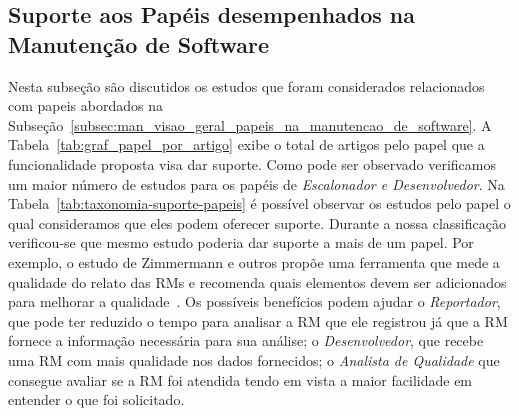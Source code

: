 \subsection{Suporte aos Papéis desempenhados na Manutenção de Software}\label{sub:extensões_com_suporte_a_papeis}

Nesta subseção são discutidos os estudos que foram considerados relacionados
com papeis abordados na
Subseção~\ref{subsec:man_visao_geral_papeis_na_manutencao_de_software}. A
Tabela~\ref{tab:graf_papel_por_artigo} exibe o total de artigos pelo papel que
a funcionalidade proposta visa dar suporte.  Como pode ser observado
verificamos um maior número de estudos para os papéis de \textit{Escalonador e
    Desenvolvedor}. Na Tabela~\ref{tab:taxonomia-suporte-papeis} é possível
observar os estudos pelo papel o qual consideramos que eles podem oferecer
suporte. Durante a nossa classificação verificou-se que mesmo estudo poderia
dar suporte a mais de um papel. Por exemplo, o estudo de Zimmermann e outros
propõe uma ferramenta que mede a qualidade do relato das RMs e recomenda quais
elementos devem ser adicionados para melhorar a
qualidade~\cite{zimmermann2010makes}. Os possíveis benefícios podem ajudar o
\textit{Reportador}, que pode ter reduzido o tempo para analisar a RM que ele
registrou já que a RM fornece a informação necessária para sua análise; o
\textit{Desenvolvedor}, que recebe uma RM com mais qualidade nos dados
fornecidos; o \textit{Analista de Qualidade} que consegue avaliar se a RM foi
atendida tendo em vista a maior facilidade em entender o que foi solicitado.

\begin{table}[htpb]
\centering
{}
\caption{Total de artigos por papel na manutenção de software}\label{tab:graf_papel_por_artigo}
\end{table}


